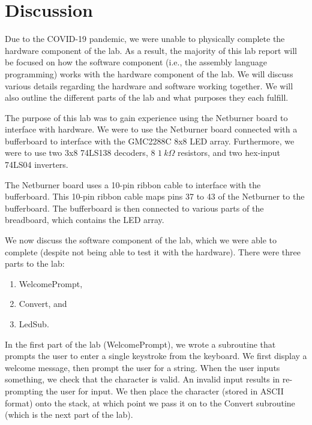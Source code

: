 \documentclass[10pt, letterpaper, titlepage]{article} %
\title{\textbf{\Huge{
\begin{center}
Hardware Interfacing \\ 😂😂😂 \\
\end{center}
}}}
\author{\B enjamin Kong | 1573684\\Lora Ma ||||| 1570935\\ \\ECE 212 Lab Section H11}
\begin{document}
 
\maketitle 
\thispagestyle{empty}
\tableofcontents 
\newpage
{}

\section{Discussion}

Due to the COVID-19 pandemic, we were unable to physically complete the hardware component of the lab. As a result, the majority of this lab report will be focused on how the software component (i.e., the assembly language programming) works with the hardware component of the lab. We will discuss various details regarding the hardware and software working together. We will also outline the different parts of the lab and what purposes they each fulfill.

The purpose of this lab was to gain experience using the Netburner board to interface with hardware. We were to use the Netburner board connected with a bufferboard to interface with the GMC2288C 8x8 LED array. Furthermore, we were to use two 3x8 74LS138 decoders, 8 $\SI{1}{k\Omega}$ resistors, and two hex-input 74LS04 inverters. 

The Netburner board uses a 10-pin ribbon cable to interface with the bufferboard. This 10-pin ribbon cable maps pins 37 to 43 of the Netburner to the bufferboard. The bufferboard is then connected to various parts of the breadboard, which contains the LED array. 

We now discuss the software component of the lab, which we were able to complete (despite not being able to test it with the hardware). There were three parts to the lab:
\begin{enumerate}
\item WelcomePrompt,
\item Convert, and
\item LedSub.
\end{enumerate}
In the first part of the lab (WelcomePrompt), we wrote a subroutine that prompts the user to enter a single keystroke from the keyboard. We first display a welcome message, then prompt the user for a string. When the user inputs something, we check that the character is valid. An invalid input results in re-prompting the user for input. We then place the character (stored in ASCII format) onto the stack, at which point we pass it on to the Convert subroutine (which is the next part of the lab).
\end{document}
